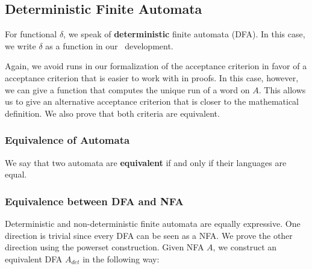 
\subsection{Deterministic Finite Automata}
For functional $\delta$, we speak of \textbf{deterministic} finite automata (DFA). 
In this case, we write $\delta$ as a function in our \coq\ development. 



Again, we avoid runs in our formalization of the acceptance criterion in favor of a acceptance criterion that is easier to work with in proofs.
In this case, however, we can give a function that computes the unique run of a word on $A$.
This allows us to give an alternative acceptance criterion that is closer to the mathematical definition.
We also prove that both criteria are equivalent.



%


\subsubsection{Equivalence of Automata}
\begin{definition}
    We say that two automata are \textbf{equivalent} if and only if their languages are equal.
\end{definition}

\subsubsection{Equivalence between DFA and NFA}
 
Deterministic and non-deterministic finite automata are equally expressive. 
One direction is trivial since every DFA can be seen as a NFA. 
We prove the other direction using the powerset construction. 
Given NFA $A$, we construct an equivalent DFA $A_{det}$ in the following way:

